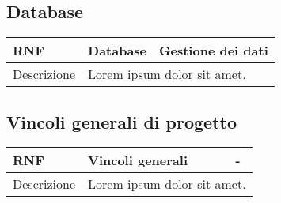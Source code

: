 \documentclass{scrreprt}
\begin{document}

	\subsection{Database}
	\FloatBarrier
		\begin{table}[h|]
	\centering
	\begin{tabular}{|l|p{6cm}|p{6cm}|}
	\hline
	\textbf{RNF\thernf} & \textbf{Database} & \textbf{Gestione dei dati} \\ \hline
	Descrizione  & \multicolumn{2}{p{12cm}|}{Lorem ipsum dolor sit amet.}\\ \hline
	\end{tabular}
	\end{table}
	\FloatBarrier


	\subsection{Vincoli generali di progetto}
	\FloatBarrier
	\begin{table}[h|]
	\centering
	\begin{tabular}{|l|p{6cm}|p{6cm}|}
	\hline
	\textbf{RNF\thernf} & \textbf{Vincoli generali} & \textbf{-} \\ \hline
	Descrizione  & \multicolumn{2}{p{12cm}|}{ Lorem ipsum dolor sit amet.} \\ \hline
	\end{tabular}
	\end{table}
	\FloatBarrier

	
\end{document}
